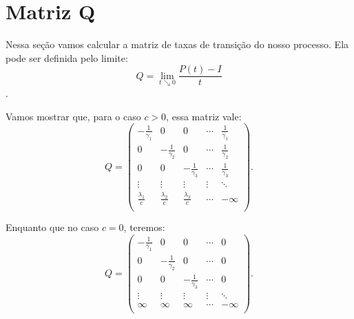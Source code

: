
\section{Matriz Q}
\label{sec:matrizq}

Nessa seção vamos calcular a matriz de taxas de transição do nosso
processo. Ela pode ser definida pelo limite:
\begin{displaymath}
  Q = \lim_{t \searrow 0} \frac{P(t) - I}{t} 
\end{displaymath}.

Vamos mostrar que, para o caso $c > 0$, essa matriz vale:
\begin{displaymath}
  Q = \left(
    \begin{array}{ccccc}
      -\frac{1}{\gamma_1} & 0 & 0 & \cdots & \frac{1}{\gamma_1}\\
      0 & -\frac{1}{\gamma_2} & 0 & \cdots & \frac{1}{\gamma_2}\\
      0 & 0 & -\frac{1}{\gamma_3} & \cdots & \frac{1}{\gamma_3}\\
      \vdots & \vdots & \vdots & \vdots & \ddots \\
      \frac{\lambda_1}{c} & \frac{\lambda_2}{c} &
      \frac{\lambda_3}{c} & \cdots & -\infty\\
    \end{array}
  \right).
\end{displaymath}

Enquanto que no caso $c=0$, teremos:
\begin{displaymath}
  Q = \left(
    \begin{array}{ccccc}
      -\frac{1}{\gamma_1} & 0 & 0 & \cdots & 0\\
      0 & -\frac{1}{\gamma_2} & 0 & \cdots & 0\\
      0 & 0 & -\frac{1}{\gamma_3} & \cdots & 0\\
      \vdots & \vdots & \vdots & \vdots & \ddots \\
      \infty & \infty & \infty & \cdots & -\infty\\
    \end{array}
  \right).
\end{displaymath}

